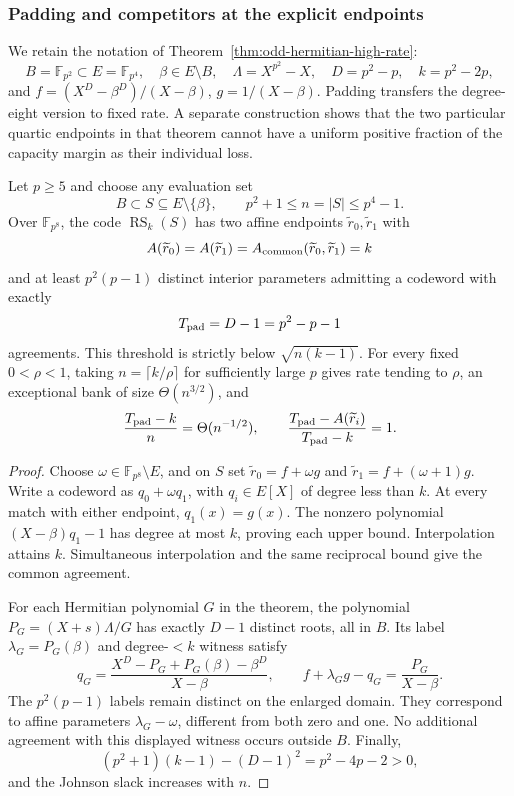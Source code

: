 \subsubsection{Padding and competitors at the explicit endpoints}
\label{sec:hermitian-followups}
We retain the notation of Theorem~\ref{thm:odd-hermitian-high-rate}:
\[
 B=\mathbb F_{p^2}\subset E=\mathbb F_{p^4},\quad
 \beta\in E\setminus B,\quad
 \Lambda=X^{p^2}-X,\quad D=p^2-p,\quad k=p^2-2p,
\]
and $f=(X^D-\beta^D)/(X-\beta)$, $g=1/(X-\beta)$.
Padding transfers the degree-eight version to fixed rate. A separate
construction shows that the two particular quartic endpoints in that
theorem cannot have a uniform positive fraction of the capacity margin
as their individual loss.

\begin{corollary}
\label{cor:hermitian-fixed-rate-padding}
Let $p\ge5$ and choose any evaluation set
\[
 B\subset S\subseteq E\setminus\{\beta\},\qquad
 p^2+1\le n=|S|\le p^4-1.
\]
Over $\mathbb F_{p^8}$, the code $\operatorname{RS}_k(S)$ has two
affine endpoints $\widetilde r_0,\widetilde r_1$ with
\[
 A(\widetilde r_0)=A(\widetilde r_1)
 =A_{\rm common}(\widetilde r_0,\widetilde r_1)=k
\]
and at least $p^2(p-1)$ distinct interior parameters admitting a
codeword with exactly
\[
 T_{\rm pad}=D-1=p^2-p-1
\]
agreements. This threshold is strictly below $\sqrt{n(k-1)}$.
For every fixed $0<\rho<1$, taking $n=\lceil k/\rho\rceil$ for
sufficiently large $p$ gives rate tending to $\rho$, an exceptional
bank of size $\Theta(n^{3/2})$, and
\[
 \frac{T_{\rm pad}-k}{n}=\Theta(n^{-1/2}),\qquad
 \frac{T_{\rm pad}-A(\widetilde r_i)}{T_{\rm pad}-k}=1.
\]
\end{corollary}
\begin{proof}
Choose $\omega\in\mathbb F_{p^8}\setminus E$, and on $S$ set
$\widetilde r_0=f+\omega g$ and
$\widetilde r_1=f+(\omega+1)g$.
Write a codeword as $q_0+\omega q_1$, with $q_i\in E[X]$ of
degree less than $k$. At every match with either endpoint,
$q_1(x)=g(x)$. The nonzero polynomial $(X-\beta)q_1-1$ has degree
at most $k$, proving each upper bound. Interpolation attains $k$.
Simultaneous interpolation and the same reciprocal bound give the
common agreement.

For each Hermitian polynomial $G$ in the theorem, the polynomial
$P_G=(X+s)\Lambda/G$ has exactly $D-1$ distinct roots, all in $B$.
Its label $\lambda_G=P_G(\beta)$ and degree-$<k$ witness satisfy
\[
 q_G=\frac{X^D-P_G+P_G(\beta)-\beta^D}{X-\beta},
 \qquad f+\lambda_G g-q_G=\frac{P_G}{X-\beta}.
\]
The $p^2(p-1)$ labels remain distinct on the enlarged domain.
They correspond to affine parameters $\lambda_G-\omega$, different
from both zero and one. No additional agreement with this displayed
witness occurs outside $B$. Finally,
\[
 (p^2+1)(k-1)-(D-1)^2=p^2-4p-2>0,
\]
and the Johnson slack increases with $n$.
\end{proof}

